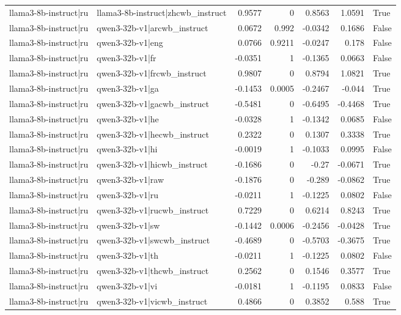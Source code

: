 \begin{table}
\begin{tabular}{l l r r r r l}
llama3-8b-instruct|ru & llama3-8b-instruct|zhcwb_instruct & 0.9577 & 0 & 0.8563 & 1.0591 & True \\
llama3-8b-instruct|ru & qwen3-32b-v1|arcwb_instruct & 0.0672 & 0.992 & -0.0342 & 0.1686 & False \\
llama3-8b-instruct|ru & qwen3-32b-v1|eng & 0.0766 & 0.9211 & -0.0247 & 0.178 & False \\
llama3-8b-instruct|ru & qwen3-32b-v1|fr & -0.0351 & 1 & -0.1365 & 0.0663 & False \\
llama3-8b-instruct|ru & qwen3-32b-v1|frcwb_instruct & 0.9807 & 0 & 0.8794 & 1.0821 & True \\
llama3-8b-instruct|ru & qwen3-32b-v1|ga & -0.1453 & 0.0005 & -0.2467 & -0.044 & True \\
llama3-8b-instruct|ru & qwen3-32b-v1|gacwb_instruct & -0.5481 & 0 & -0.6495 & -0.4468 & True \\
llama3-8b-instruct|ru & qwen3-32b-v1|he & -0.0328 & 1 & -0.1342 & 0.0685 & False \\
llama3-8b-instruct|ru & qwen3-32b-v1|hecwb_instruct & 0.2322 & 0 & 0.1307 & 0.3338 & True \\
llama3-8b-instruct|ru & qwen3-32b-v1|hi & -0.0019 & 1 & -0.1033 & 0.0995 & False \\
llama3-8b-instruct|ru & qwen3-32b-v1|hicwb_instruct & -0.1686 & 0 & -0.27 & -0.0671 & True \\
llama3-8b-instruct|ru & qwen3-32b-v1|raw & -0.1876 & 0 & -0.289 & -0.0862 & True \\
llama3-8b-instruct|ru & qwen3-32b-v1|ru & -0.0211 & 1 & -0.1225 & 0.0802 & False \\
llama3-8b-instruct|ru & qwen3-32b-v1|rucwb_instruct & 0.7229 & 0 & 0.6214 & 0.8243 & True \\
llama3-8b-instruct|ru & qwen3-32b-v1|sw & -0.1442 & 0.0006 & -0.2456 & -0.0428 & True \\
llama3-8b-instruct|ru & qwen3-32b-v1|swcwb_instruct & -0.4689 & 0 & -0.5703 & -0.3675 & True \\
llama3-8b-instruct|ru & qwen3-32b-v1|th & -0.0211 & 1 & -0.1225 & 0.0802 & False \\
llama3-8b-instruct|ru & qwen3-32b-v1|thcwb_instruct & 0.2562 & 0 & 0.1546 & 0.3577 & True \\
llama3-8b-instruct|ru & qwen3-32b-v1|vi & -0.0181 & 1 & -0.1195 & 0.0833 & False \\
llama3-8b-instruct|ru & qwen3-32b-v1|vicwb_instruct & 0.4866 & 0 & 0.3852 & 0.588 & True \\

\end{tabular}
\end{table}
